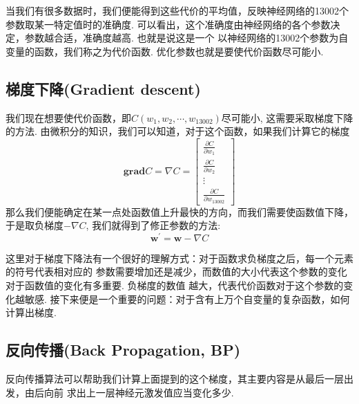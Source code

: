 \documentclass[UTF8]{ctexbook}
\begin{document}
当我们有很多数据时，我们便能得到这些代价的平均值，反映神经网络的13002个参数取某一特定值时的准确度.
可以看出，这个准确度由神经网络的各个参数决定，参数越合适，准确度越高. 也就是说这是一个
以神经网络的13002个参数为自变量的函数，我们称之为代价函数. 优化参数也就是要使代价函数尽可能小.
\subsection{梯度下降(Gradient descent)}
我们现在想要使代价函数，即$C(w_1,w_2,\cdots,w_{13002})$尽可能小, 这需要采取梯度下降的方法.
由微积分的知识，我们可以知道，对于这个函数，如果我们计算它的梯度
\[\mathbf{grad} C=\nabla C=
\begin{bmatrix}
    \frac{\partial C}{\partial w_1} \\
    \frac{\partial C}{\partial w_2} \\
    \vdots \\
    \frac{\partial C}{\partial w_{13002}} 
\end{bmatrix}
\]
那么我们便能确定在某一点处函数值上升最快的方向，而我们需要使函数值下降，于是取负梯度$-\nabla C$, 
我们就得到了修正参数的方法:
\[\mathbf{w^{'}}=\mathbf{w}-\nabla C\]

这里对于梯度下降法有一个很好的理解方式：对于函数求负梯度之后，每一个元素的符号代表相对应的
参数需要增加还是减少，而数值的大小代表这个参数的变化对于函数值的变化有多重要. 负梯度的数值
越大，代表代价函数对于这个参数的变化越敏感.
接下来便是一个重要的问题：对于含有上万个自变量的复杂函数，如何计算出梯度.
\subsection{反向传播(Back Propagation, BP)}
反向传播算法可以帮助我们计算上面提到的这个梯度，其主要内容是从最后一层出发，由后向前
求出上一层神经元激发值应当变化多少.
\end{document}
